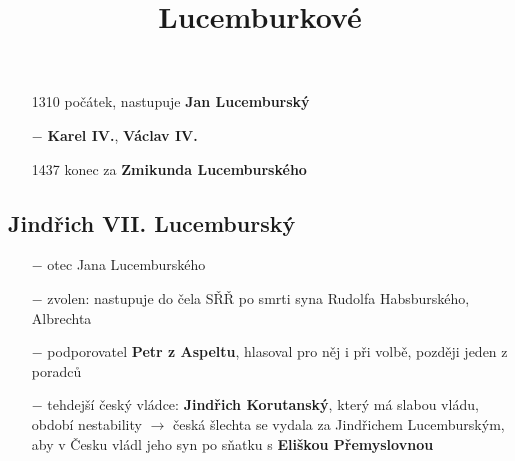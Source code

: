 \documentclass{article}
\title{\vspace{-2cm}Lucemburkové\vspace{-1.7cm}}
\date{}
\author{}
\begin{document}
\maketitle

\begin{itemize}
    \vspace{-0.5em}
    \setlength\itemsep{0.15em}
    \item[1310] počátek, nastupuje \textbf{Jan Lucemburský}
    \item[$-$] \textbf{Karel IV.}, \textbf{Václav IV.}
    \item[1437] konec za \textbf{Zmikunda Lucemburského}
\end{itemize}

\subsection*{Jindřich VII. Lucemburský}
\begin{itemize}
    \vspace{-0.5em}
    \setlength\itemsep{0.15em}
    \item[$-$] otec Jana Lucemburského
    \item[$-$] zvolen: nastupuje do čela SŘŘ po smrti syna Rudolfa Habsburského, Albrechta
    \item[$-$] podporovatel \textbf{Petr z Aspeltu}, hlasoval pro něj i při volbě, později jeden z poradců
    \item[$-$] tehdejší český vládce: \textbf{Jindřich Korutanský}, který má slabou vládu, období nestability $\rightarrow$ česká šlechta se vydala za Jindřichem Lucemburským, aby v Česku vládl jeho syn po sňatku s \textbf{Eliškou Přemyslovnou}
\end{itemize}
\end{document}
